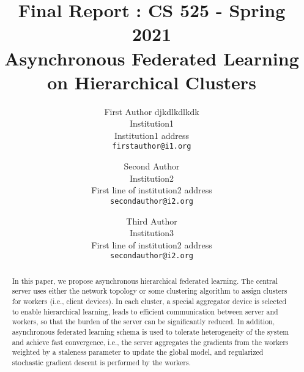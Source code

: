 \documentclass[10pt,twocolumn,letterpaper]{article}
\theoremstyle{definition}
\begin{document}
\title{Final Report : CS 525 - Spring 2021\\
Asynchronous Federated Learning on Hierarchical Clusters}

\author{First Author djkdlkdlkdk\\
Institution1\\
Institution1 address\\
{\tt\small firstauthor@i1.org}
\and
Second Author\\
Institution2\\
First line of institution2 address\\
{\tt\small secondauthor@i2.org}


\and
Third Author\\
Institution3\\
First line of institution2 address\\
{\tt\small secondauthor@i2.org}
}

\maketitle

\begin{abstract}
In this paper, we propose asynchronous hierarchical federated learning. 
The central server uses either the network topology or some clustering algorithm to assign clusters for workers (i.e., client devices). In each cluster, a special aggregator device is selected to enable hierarchical learning, leads to efficient communication between server and workers, so that the burden of the server can be significantly reduced. In addition, asynchronous federated learning schema is used to tolerate heterogeneity of the system and achieve fast convergence, i.e., the server aggregates the gradients from the workers weighted by a staleness parameter to update the global model, and regularized stochastic gradient descent is performed by the workers. 
\end{abstract}
\end{document}
